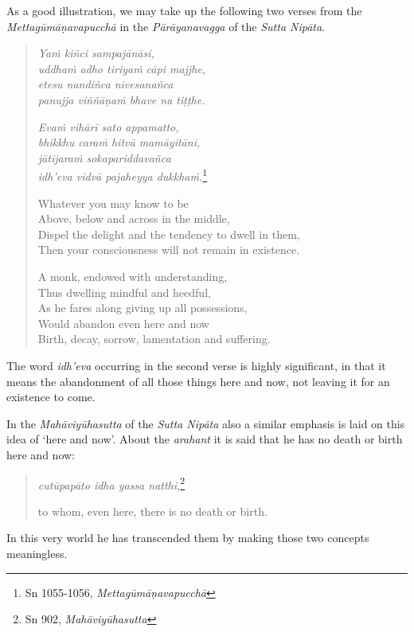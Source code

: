 As a good illustration, we may take up the following two verses from the \emph{Mettagūmāṇavapucchā} in the \emph{Pārāyanavagga} of the \emph{Sutta Nipāta}.

\enlargethispage{\baselineskip}

\begin{quote}
\emph{Yaṁ kiñci sampajānāsi,}\\
\emph{uddhaṁ adho tiriyaṁ cāpi majjhe,}\\
\emph{etesu nandiñca nivesanañca}\\
\emph{panujja viññāṇaṁ bhave na tiṭṭhe.}

\emph{Evaṁ vihārī sato appamatto,}\\
\emph{bhikkhu caraṁ hitvā mamāyitāni,}\\
\emph{jātijaraṁ sokapariddavañca}\\
\emph{idh'eva vidvā pajaheyya dukkhaṁ.}\footnote{Sn 1055-1056, \emph{Mettagūmāṇavapucchā}}

Whatever you may know to be\\
Above, below and across in the middle,\\
Dispel the delight and the tendency to dwell in them,\\
Then your consciousness will not remain in existence.

A monk, endowed with understanding,\\
Thus dwelling mindful and heedful,\\
As he fares along giving up all possessions,\\
Would abandon even here and now\\
Birth, decay, sorrow, lamentation and suffering.
\end{quote}

The word \emph{idh'eva} occurring in the second verse is highly significant, in that it means the abandonment of all those things here and now, not leaving it for an existence to come.

In the \emph{Mahāviyūhasutta} of the \emph{Sutta Nipāta} also a similar emphasis is laid on this idea of `here and now'. About the \emph{arahant} it is said that he has no death or birth here and now:

\begin{quote}
\emph{cutūpapāto idha yassa natthi,}\footnote{Sn 902, \emph{Mahāviyūhasutta}}

to whom, even here, there is no death or birth.
\end{quote}

In this very world he has transcended them by making those two concepts meaningless.

